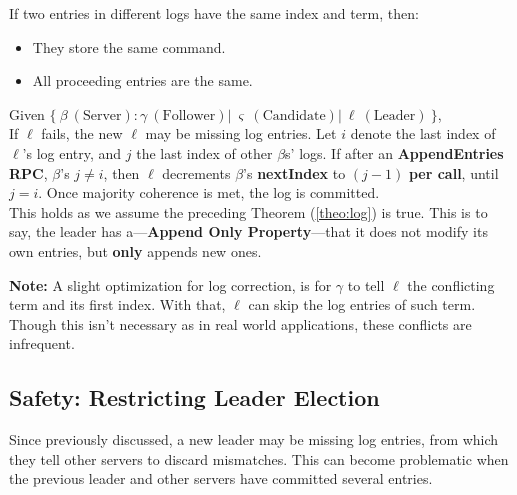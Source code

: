 \begin{theo}

    \label{theo:log}
    If two entries in different logs have the same index and term, then:
    \begin{itemize}
        \item They store the same command.
        \item All proceeding entries are the same.
    \end{itemize}
\end{theo}

\begin{Def}

    Given $\{\ \beta\ (\text{Server}): \gamma\ (\text{Follower})  |\ \varsigma\ (\text{Candidate}) |\ \ell\ (\text{Leader})\ \}$,\\

    \noindent
    If $\ell$ fails, the new $\ell$ may be missing log entries. Let $i$ denote the last index of $\ell$'s log entry, and $j$ the last index of other $\beta$s' logs.
    If after an \textbf{AppendEntries RPC}, $\beta$'s $j\neq i$, then $\ell$ decrements $\beta$'s \textbf{nextIndex} to $(j-1)$ \textbf{per call}, until $j=i$.
    Once majority coherence is met, the log is committed.\\

    \noindent
    This holds as we assume the preceding Theorem (\ref{theo:log}) is true. This is to say, the leader has a---\textbf{Append Only Property}---that it does not modify its own entries, but \textbf{only} appends new ones.
\end{Def}

\vspace{-.5em}
\begin{Note} 

    \textbf{Note:} A slight optimization for log correction, is for $\gamma$ to tell $\ell$ the conflicting term and its first index.
    With that, $\ell$ can skip the log entries of such term. Though this isn't necessary as in real world applications, these conflicts are 
    infrequent.
\end{Note}

\noindent


\newpage 

\subsection{Safety: Restricting Leader Election}
\noindent
Since previously discussed, a new leader may be missing log entries, from which they tell other servers to discard mismatches. 
This can become problematic when the previous leader and other servers have committed several entries.\\

